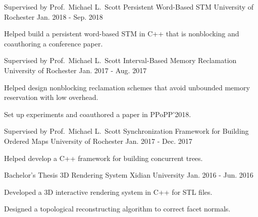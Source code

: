 \begin{cventries}
  \cventry
    {Supervised by Prof.\ Michael L.\ Scott} %
    {Persistent Word-Based STM} %
    {University of Rochester} %
    {Jan. 2018 - Sep. 2018} %
    {
      \begin{cvitems} %
        \item {Helped build a persistent word-based STM in C++ that is nonblocking and coauthoring a conference paper.}
      \end{cvitems}
    }

  \cventry
    {Supervised by Prof.\ Michael L.\ Scott} %
    {Interval-Based Memory Reclamation} %
    {University of Rochester} %
    {Jan. 2017 - Aug. 2017} %
    {
      \begin{cvitems} %
        \item {Helped design nonblocking reclamation schemes that avoid unbounded memory reservation with low overhead.}
        \item {Set up experiments and coauthored a paper in PPoPP'2018.}
      \end{cvitems}
    }

  \cventry
    {Supervised by Prof.\ Michael L.\ Scott} %
    {Synchronization Framework for Building Ordered Maps} %
    {University of Rochester} %
    {Jan. 2017 - Dec. 2017} %
    {
      \begin{cvitems} %
        \item {Helped develop a C++ framework for building concurrent trees.}
      \end{cvitems}
    }

  \cventry
    {Bachelor's Thesis} %
    {3D Rendering System} %
    {Xidian University} %
    {Jan. 2016 - Jun. 2016} %
    {
      \begin{cvitems} %
        \item {Developed a 3D interactive rendering system in C++ for STL files.}
        \item {Designed a topological reconstructing algorithm to correct facet normals.}
      \end{cvitems}
    }
\end{cventries}

